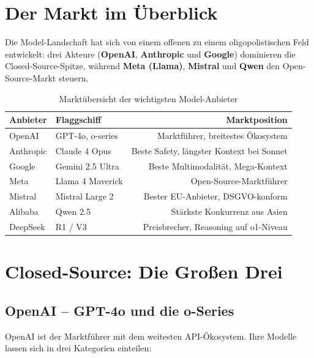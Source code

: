 \section{Der Markt im Überblick}

Die Model-Landschaft hat sich von einem offenen zu einem oligopolistischen Feld entwickelt: drei Akteure (\textbf{OpenAI}, \textbf{Anthropic} und \textbf{Google}) dominieren die Closed-Source-Spitze, während \textbf{Meta (Llama)}, \textbf{Mistral} und \textbf{Qwen} den Open-Source-Markt steuern.

\begin{table}[H]
\centering
\begin{tabularx}{\linewidth}{lXr}
\toprule
\textbf{Anbieter} & \textbf{Flaggschiff} & \textbf{Marktposition} \\
\midrule
OpenAI & GPT-4o, o-series & Marktführer, breitestes Ökosystem \\
Anthropic & Claude 4 Opus & Beste Safety, längster Kontext bei Sonnet \\
Google & Gemini 2.5 Ultra & Beste Multimodalität, Mega-Kontext \\
Meta & Llama 4 Maverick & Open-Source-Marktführer \\
Mistral & Mistral Large 2 & Bester EU-Anbieter, DSGVO-konform \\
Alibaba & Qwen 2.5 & Stärkste Konkurrenz aus Asien \\
DeepSeek & R1 / V3 & Preisbrecher, Reasoning auf o1-Niveau \\
\bottomrule
\end{tabularx}
\caption{Marktübersicht der wichtigsten Model-Anbieter}
\label{tab:markt}
\end{table}

\section{Closed-Source: Die Großen Drei}

\subsection{OpenAI -- GPT-4o und die o-Series}

OpenAI ist der Marktführer mit dem weitesten API-Ökosystem. Ihre Modelle lassen sich in drei Kategorien einteilen:

